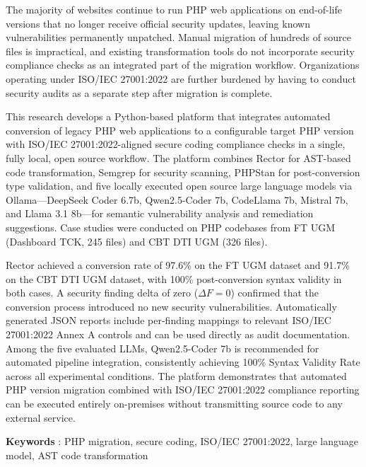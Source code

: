 \begin{itshape}
The majority of websites continue to run PHP web applications on end-of-life versions that no longer receive official security updates, leaving known vulnerabilities permanently unpatched. Manual migration of hundreds of source files is impractical, and existing transformation tools do not incorporate security compliance checks as an integrated part of the migration workflow. Organizations operating under ISO/IEC 27001:2022 are further burdened by having to conduct security audits as a separate step after migration is complete.

\hspace{1cm} This research develops a Python-based platform that integrates automated conversion of legacy PHP web applications to a configurable target PHP version with ISO/IEC 27001:2022-aligned secure coding compliance checks in a single, fully local, open source workflow. The platform combines Rector for AST-based code transformation, Semgrep for security scanning, PHPStan for post-conversion type validation, and five locally executed open source large language models via Ollama---DeepSeek Coder 6.7b, Qwen2.5-Coder 7b, CodeLlama 7b, Mistral 7b, and Llama 3.1 8b---for semantic vulnerability analysis and remediation suggestions. Case studies were conducted on PHP codebases from FT UGM (Dashboard TCK, 245 files) and CBT DTI UGM (326 files).

\hspace{1cm} Rector achieved a conversion rate of 97.6\% on the FT UGM dataset and 91.7\% on the CBT DTI UGM dataset, with 100\% post-conversion syntax validity in both cases. A security finding delta of zero ($\Delta F = 0$) confirmed that the conversion process introduced no new security vulnerabilities. Automatically generated JSON reports include per-finding mappings to relevant ISO/IEC 27001:2022 Annex A controls and can be used directly as audit documentation. Among the five evaluated LLMs, Qwen2.5-Coder 7b is recommended for automated pipeline integration, consistently achieving 100\% Syntax Validity Rate across all experimental conditions. The platform demonstrates that automated PHP version migration combined with ISO/IEC 27001:2022 compliance reporting can be executed entirely on-premises without transmitting source code to any external service.
\end{itshape}

\noindent\textbf{Keywords} : PHP migration, secure coding, ISO/IEC 27001:2022, large language model, AST code transformation
